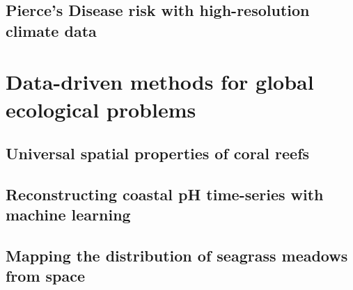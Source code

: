 \documentclass[
	10pt, %
	fleqn, %
	a4paper, %
]{LegrandOrangeBook}
\begin{document}
\chapter{Pierce's Disease risk with high-resolution climate data}


{
	\hypersetup{hidelinks}
	\part{Data-driven methods for global ecological problems}
}

\chapterspaceabove{6.75cm}
\chapterspacebelow{7.25cm}

\chapter{Universal spatial properties of coral reefs}


\chapterspaceabove{6.75cm}
\chapterspacebelow{7.25cm}

\chapter{Reconstructing coastal pH time-series with machine learning}


\chapterspaceabove{6.75cm}
\chapterspacebelow{7.25cm}

\chapter{Mapping the distribution of seagrass meadows from space}

\end{document}
